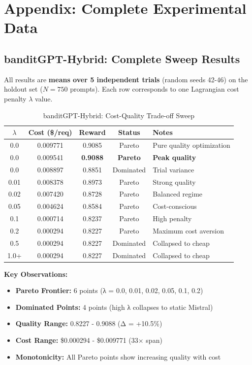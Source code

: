 
\section*{Appendix: Complete Experimental Data}

\subsection*{banditGPT-Hybrid: Complete Sweep Results}

All results are \textbf{means over 5 independent trials} (random seeds 42-46) on the holdout set ($N=750$ prompts). Each row corresponds to one Lagrangian cost penalty $\lambda$ value.

\begin{table}[H]
\centering
\caption{banditGPT-Hybrid: Cost-Quality Trade-off Sweep}
\label{tab:banditgpt_complete}
\begin{tabular}{ccccl}
\toprule
$\lambda$ & \textbf{Cost (\$/req)} & \textbf{Reward} & \textbf{Status} & \textbf{Notes} \\
\midrule
0.0  & 0.009771 & 0.9085 & Pareto & Pure quality optimization \\
0.0  & 0.009541 & \textbf{0.9088} & \textbf{Pareto} & \textbf{Peak quality} \\
0.0  & 0.008897 & 0.8851 & Dominated & Trial variance \\
0.01 & 0.008378 & 0.8973 & Pareto & Strong quality \\
0.02 & 0.007420 & 0.8728 & Pareto & Balanced regime \\
0.05 & 0.004624 & 0.8584 & Pareto & Cost-conscious \\
0.1  & 0.000714 & 0.8237 & Pareto & High penalty \\
0.2  & 0.000294 & 0.8227 & Pareto & Maximum cost aversion \\
0.5  & 0.000294 & 0.8227 & Dominated & Collapsed to cheap \\
1.0+ & 0.000294 & 0.8227 & Dominated & Collapsed to cheap \\
\bottomrule
\end{tabular}
\end{table}

\textbf{Key Observations:}
\begin{itemize}
    \item \textbf{Pareto Frontier:} 6 points (λ = 0.0, 0.01, 0.02, 0.05, 0.1, 0.2)
    \item \textbf{Dominated Points:} 4 points (high λ collapses to static Mistral)
    \item \textbf{Quality Range:} 0.8227 - 0.9088 (Δ = +10.5\%)
    \item \textbf{Cost Range:} \$0.000294 - \$0.009771 (33$\times$ span)
    \item \textbf{Monotonicity:} All Pareto points show increasing quality with cost
\end{itemize}


